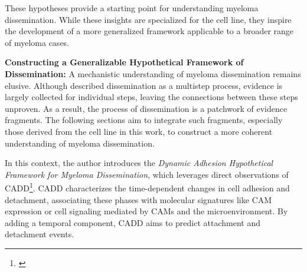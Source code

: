 These hypotheses   provide a starting
point for understanding myeloma dissemination. While these insights are
specialized for the \INA cell line, they inspire the development of a more
generalized framework applicable to a broader range of myeloma cases.

\textbf{Constructing a Generalizable Hypothetical Framework of Dissemination:}
A mechanistic understanding of myeloma dissemination remains elusive. Although
\citet{zeissigTumourDisseminationMultiple2020} described dissemination as a
multistep process, evidence is largely collected for individual steps, leaving
the connections between these steps unproven. As a result, the process of
dissemination is a patchwork of evidence fragments. The following sections aim
to integrate such fragments, especially those derived from the \INA cell line in
this work, to construct a more coherent understanding of myeloma dissemination.

In this context, the author introduces the \emph{Dynamic Adhesion Hypothetical Framework for
      Myeloma Dissemination}, which leverages direct observations of
\acf{CADD}\footnote{\footcadd\label{foot:cadd}}. \ac{CADD} characterizes
the time-dependent changes in cell adhesion and detachment, associating these
phases with molecular signatures like \ac{CAM} expression or cell signaling
mediated by \acp{CAM} and the microenvironment. By adding a temporal component,
\ac{CADD} aims to predict attachment and detachment events.



\newcommand{\caddadaptation}{ %
      \ac{CADD} is adapted in response to different microenvironments faced
      during dissemination %
}
\newcommand{\caddadaptationtitle}{ %
      \textit{Hypothesis 1}: \acl{CADD} (\acs{CADD}) is Adapted during Dissemination%
}%


\newcommand{\caddadaptibility}{ %
      Rapid adaptability of \ac{CADD} is a hallmark of aggressive myeloma %
}%
\newcommand{\caddadaptabilitytitle}{ %
      \textit{Hypothesis 2}: Rapid Adaptability of CADD is a Hallmark of
      Aggressive Myeloma %
}%

